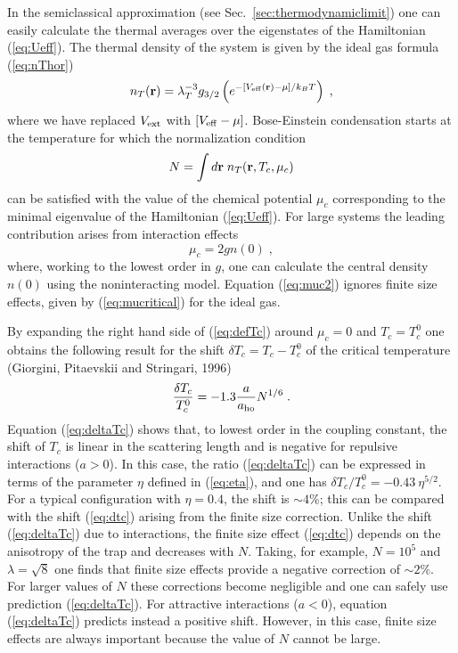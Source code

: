 In the semiclassical approximation (see Sec.~\ref{sec:thermodynamiclimit}) 
one can easily calculate the thermal averages over the eigenstates of the 
Hamiltonian (\ref{eq:Ueff}). The thermal density of the system
is given by the ideal gas formula (\ref{eq:nThor})
\begin{equation}
n_T({\bf r}) =
\lambda_T^{-3} g_{3/2}\left(e^{-[V_{\rm eff}({\bf r}) - \mu]
/k_BT}\right) \;,
\label{eq:nrhf}
\end{equation}
where we have replaced $V_{\rm ext}$ with $[V_{\rm eff}-\mu]$.
Bose-Einstein condensation starts at the
temperature for which the normalization condition
\begin{equation}
N = \int d{\bf r} \; n_T({\bf r},T_c,\mu_c)
\label{eq:defTc}
\end{equation}
can be satisfied with the value of the chemical potential $\mu_c$
corresponding to the minimal eigenvalue of the Hamiltonian (\ref{eq:Ueff}).
For large systems the leading contribution arises from interaction effects
\begin{equation}
\mu_c =  2gn(0) \;,
\label{eq:muc2}
\end{equation}
where, working to the lowest order in $g$, one can calculate the central
density $n(0)$ using the noninteracting model.  Equation (\ref{eq:muc2})
ignores finite size effects, given by (\ref{eq:mucritical}) for the ideal 
gas.

By expanding the right hand side of (\ref{eq:defTc}) around 
$\mu_c = 0$ and $T_c=T_c^0$  one obtains the following result for
the shift  $\delta T_c=T_c-T_c^0$ of the critical temperature
(Giorgini, Pitaevskii and Stringari, 1996)
\begin{equation}
\frac{\delta T_c}{T_c^0}  =
-1.3 \frac{a}{a_{\rm ho}} N^{1/6} \;.
\label{eq:deltaTc}
\end{equation}
Equation (\ref{eq:deltaTc})
shows that, to lowest order in the coupling constant, the shift of
$T_c$  is linear in the scattering  length and is negative for repulsive
interactions  ($a>0$). In this case, the ratio (\ref{eq:deltaTc})
can be expressed in
terms of the parameter $\eta$ defined in (\ref{eq:eta}), and one has
$\delta T_c/T_c^0=-0.43\ \eta^{5/2}$. For a typical configuration with
$\eta=0.4$, the shift is $\sim 4$\%;   this can be compared with the 
shift (\ref{eq:dtc}) arising from the finite size correction.  Unlike the 
shift (\ref{eq:deltaTc}) due to interactions, the finite size 
effect (\ref{eq:dtc}) depends on the anisotropy of the trap and decreases
with $N$.  Taking, for example, $N=10^5$ and $\lambda=\sqrt8$ one finds
that finite size effects provide a negative correction of  $\sim 2$\%. For
larger values of $N$ these corrections become negligible and one
can safely  use prediction (\ref{eq:deltaTc}). For attractive
interactions ($a<0$), equation (\ref{eq:deltaTc}) predicts instead a
positive shift.  However, in this case, finite size effects are always
important because the value of $N$ cannot be large.

